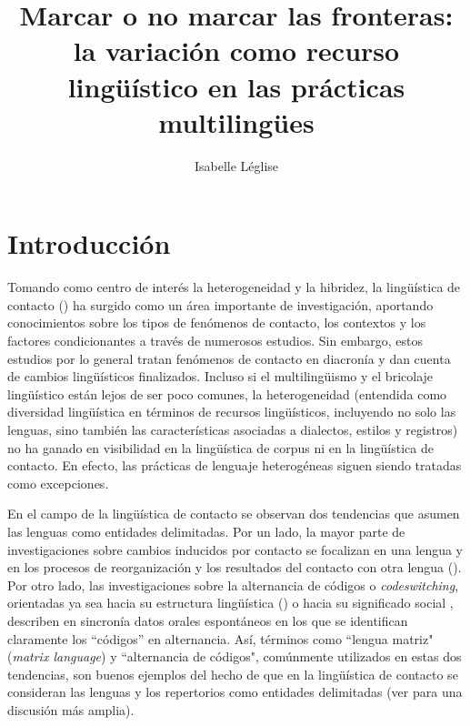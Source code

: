 \documentclass[output=paper]{langscibook}
\author{Isabelle Léglise\orcid{0000-0002-2415-4173 }\affiliation{Centre National de la Recherche Scientifique, CNRS SeDyL}}
\title{Marcar o no marcar las fronteras: la variación como recurso lingüístico en las prácticas multilingües}
\begin{document}
\maketitle 
{}%

\section{Introducción}


Tomando como centro de interés la heterogeneidad y la hibridez, la lingüística de contacto (\citealt{Thomason2001,Winford2003intro}) ha surgido como un área importante de investigación, aportando  conocimientos sobre los tipos de fenómenos de contacto, los contextos y los factores condicionantes a través de numerosos estudios.  Sin embargo, estos estudios por lo general tratan fenómenos de contacto en diacronía y dan cuenta de cambios lingüísticos finalizados. Incluso si el multilingüismo y el bricolaje lingüístico están lejos de ser poco comunes, la heterogeneidad (entendida como diversidad lingüística en términos de recursos lingüísticos, incluyendo no solo las lenguas, sino también las características asociadas a dialectos, estilos y registros) no ha ganado en visibilidad en la lingüística de corpus ni en la lingüística de contacto. En efecto, las prácticas de lenguaje heterogéneas siguen siendo tratadas como excepciones.

En el campo de la lingüística de contacto se observan dos tendencias que asumen las lenguas como entidades delimitadas. Por un lado, la mayor parte de investigaciones sobre cambios inducidos por contacto se focalizan en una lengua y en los procesos de reorganización y los resultados del contacto con otra lengua (\citealt{Thomason2001,HeineKuteva2005}). Por otro lado, las investigaciones sobre la alternancia de códigos o \textit {codeswitching}, orientadas ya sea hacia su estructura lingüística (\citealt{Myers-Scotton1993,Poplack1981}) o hacia su significado social \citep{Auer1998}, describen en sincronía datos orales espontáneos en los que se identifican claramente los “códigos” en alternancia. Así, términos como “lengua matriz" (\textit {matrix language}) y “alternancia de códigos", comúnmente utilizados en estas dos tendencias, son buenos ejemplos del hecho de que en la lingüística de contacto se consideran las lenguas y los repertorios como entidades delimitadas (ver \citet{Léglise2018} para una discusión más amplia).
\end{document}
